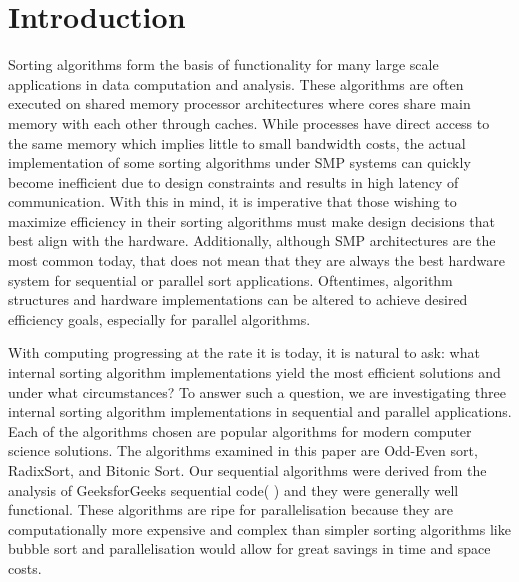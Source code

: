 \documentclass[11pt,twocolumn]{article}
\begin{document}
\section {Introduction} 


Sorting algorithms form the basis of functionality for many large scale applications in data computation and analysis. These algorithms are often executed on shared memory processor architectures where cores share main memory with each other through caches. While processes have direct access to the same memory which implies little to small bandwidth costs, the actual implementation of some sorting algorithms under SMP systems can quickly become inefficient due to design constraints and results in high latency of communication. With this in mind, it is imperative that those wishing to maximize efficiency in their sorting algorithms must make design decisions that best align with the hardware. Additionally, although SMP architectures are the most common today, that does not mean that they are always the best hardware system for sequential or parallel sort applications. Oftentimes, algorithm structures and hardware implementations can be altered to achieve desired efficiency goals, especially for parallel algorithms.

With computing progressing at the rate it is today, it is natural to ask: what internal sorting algorithm implementations yield the most efficient solutions and under what circumstances? To answer such a question, we are investigating three internal sorting algorithm implementations in sequential and parallel applications. Each of the algorithms chosen are popular algorithms for modern computer science solutions. The algorithms examined in this paper are Odd-Even sort, RadixSort, and Bitonic Sort. Our sequential algorithms were derived from the analysis of GeeksforGeeks sequential code(\cite{Sequential-Bitonic} \cite{Sequential-oddeven}\cite{Sequential-Radix}) and they were generally well functional. These algorithms are ripe for parallelisation because they are computationally more expensive and complex than simpler sorting algorithms like bubble sort and parallelisation would allow for great savings in time and space costs.
\end{document}
